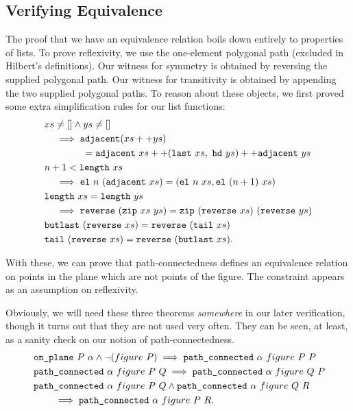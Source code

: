 \subsection{Verifying Equivalence}\label{sec:segConnectEquivalence}
The proof that we have an equivalence relation boils down entirely to properties of lists. To prove reflexivity, we use the one-element polygonal path (excluded in Hilbert's definitions). Our witness for symmetry is obtained by reversing the supplied polygonal path. Our witness for transitivity is obtained by appending the two supplied polygonal paths. To reason about these objects, we first proved some extra simplification rules for our list functions:
\begin{align*}
  &xs \neq [] \wedge ys \neq []\\ 
  &\quad\implies\code{adjacent}(\append{xs}{ys})\\
  &\qquad\qquad = \append{\append{\code{adjacent}\ xs}{(\code{last}\ xs,\ \code{hd}\ ys)}}{\code{adjacent}\ ys}\\
  &n + 1 < \code{length}\ xs\\
  &\quad\implies \el{n}{(\code{adjacent}\ xs)} = (\el{n}{xs}, \el{(n+1)}{xs})\\
  &\code{length}\ xs = \code{length}\ ys\\
  &\quad\implies\code{reverse}\ (\code{zip}\ xs\ ys) = \code{zip}\ (\code{reverse}\ xs)\ (\code{reverse}\ ys)\\
  &\code{butlast}\ (\code{reverse}\ xs) = \code{reverse}\ (\code{tail}\ xs)\\
  &\code{tail}\ (\code{reverse}\ xs) = \code{reverse}\ (\code{butlast}\ xs).
\end{align*}

With these, we can prove that path-connectedness defines an equivalence relation on points in the plane which are not points of the figure. The constraint appears as an assumption on reflexivity. 

Obviously, we will need these three theorems \emph{somewhere} in our later verification, though it turns out that they are not used very often. They can be seen, at least, as a sanity check on our notion of path-connectedness.
\begin{align*}
  \;&\texttt{on\_plane}\ P\ \alpha \wedge \neg(figure\ P) \implies \texttt{path\_connected}\ \alpha\ figure\ P\ P\\
  \;&\texttt{path\_connected}\ \alpha\ figure\ P\ Q \implies \texttt{path\_connected}\ \alpha\ figure\ Q\ P\\
  \;&\texttt{path\_connected}\ \alpha\ figure\ P\ Q \wedge \texttt{path\_connected}\ \alpha\ figure\ Q\ R\\
  &\qquad\implies \texttt{path\_connected}\ \alpha\ figure\ P\ R.
\end{align*}

